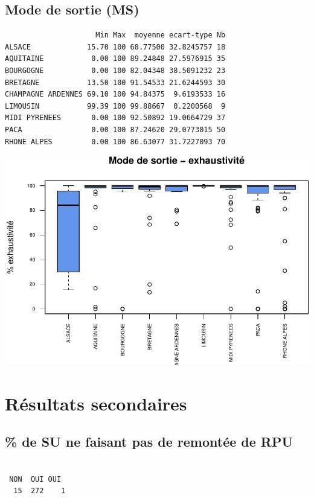 \documentclass[]{article}
\begin{document}
\subsection{Mode de sortie (MS)}\label{mode-de-sortie-ms-2}

\begin{verbatim}
                     Min Max  moyenne ecart-type Nb
ALSACE             15.70 100 68.77500 32.8245757 18
AQUITAINE           0.00 100 89.24848 27.5976915 35
BOURGOGNE           0.00 100 82.04348 38.5091232 23
BRETAGNE           13.50 100 91.54533 21.6244593 30
CHAMPAGNE ARDENNES 69.10 100 94.84375  9.6193533 16
LIMOUSIN           99.39 100 99.88667  0.2200568  9
MIDI PYRENEES       0.00 100 92.50892 19.0664729 37
PACA                0.00 100 87.24620 29.0773015 50
RHONE ALPES         0.00 100 86.63077 31.7227093 70
\end{verbatim}

\includegraphics{septembre2015_files/figure-latex/unnamed-chunk-30-1.pdf}

\section{Résultats secondaires}\label{resultats-secondaires}

\subsection{\% de SU ne faisant pas de remontée de
RPU}\label{de-su-ne-faisant-pas-de-remontee-de-rpu}

\begin{verbatim}

 NON  OUI OUI  
  15  272    1 
\end{verbatim}
\end{document}
